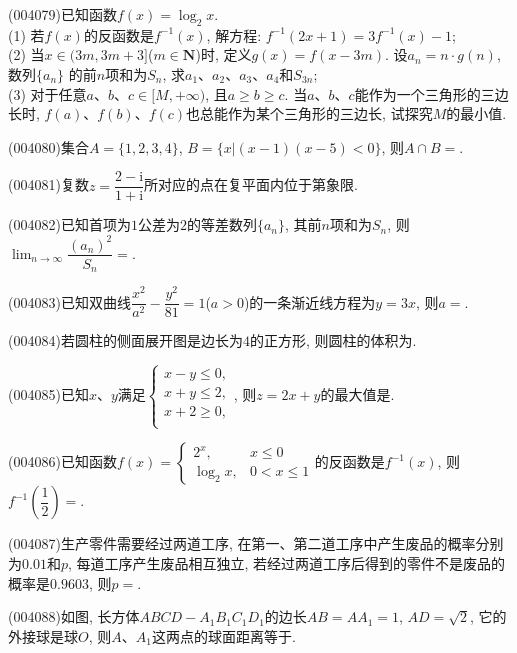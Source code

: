 \item (004079)已知函数$f(x)=\log_2x$.\\
(1) 若$f(x)$的反函数是$f^{-1}(x)$, 解方程: $f^{-1}(2x+1)=3f^{-1}(x)-1$;\\
(2) 当$x\in (3m, 3m+3]$($m\in \mathbf{N}$)时, 定义$g(x)=f(x-3m)$. 设$a_n=n\cdot g(n)$, 数列$\{a_n\}$ 的前$n$项和为$S_n$, 求$a_1$、$a_2$、$a_3$、$a_4$和$S_{3n}$;\\
(3) 对于任意$a$、$b$、$c\in [M,+\infty)$, 且$a\ge b\ge c$. 当$a$、$b$、$c$能作为一个三角形的三边长时, $f(a)$、$f(b)$、$f(c)$也总能作为某个三角形的三边长, 试探究$M$的最小值.
\item (004080)集合$A=\{1,2,3,4\}$, $B=\{x|(x-1)(x-5)<0\}$, 则$A\cap B=$.
\item (004081)复数$z=\dfrac{2-\mathrm{i}}{1+\mathrm{i}}$所对应的点在复平面内位于第象限.
\item (004082)已知首项为$1$公差为$2$的等差数列$\{a_n\}$, 其前$n$项和为$S_n$, 则$\displaystyle\lim_{n\to \infty}\dfrac{(a_n)^2}{S_n}=$.
\item (004083)已知双曲线$\dfrac{x^2}{a^2}-\dfrac{y^2}{81}=1$($a>0$)的一条渐近线方程为$y=3x$, 则$a=$.
\item (004084)若圆柱的侧面展开图是边长为$4$的正方形, 则圆柱的体积为.
\item (004085)已知$x$、$y$满足$\begin{cases}  x-y\le 0, \\  x+y\le 2, \\  x+2\ge 0,\\ \end{cases}$, 则$z=2x+y$的最大值是.
\item (004086)已知函数$f(x)=\begin{cases} 2^x, & x\le 0 \\  \log_2x, & 0<x\le 1 \end{cases}$的反函数是$f^{-1}(x)$, 则$f^{-1}(\dfrac 12)=$.
\item (004087)生产零件需要经过两道工序, 在第一、第二道工序中产生废品的概率分别为$0.01$和$p$, 每道工序产生废品相互独立, 若经过两道工序后得到的零件不是废品的概率是$0.9603$, 则$p=$.
\item (004088)如图, 长方体$ABCD-A_1B_1C_1D_1$的边长$AB=AA_1=1$, $AD=\sqrt 2$, 它的外接球是球$O$, 则$A$、$A_1$这两点的球面距离等于.
\begin{center}
\end{center}

